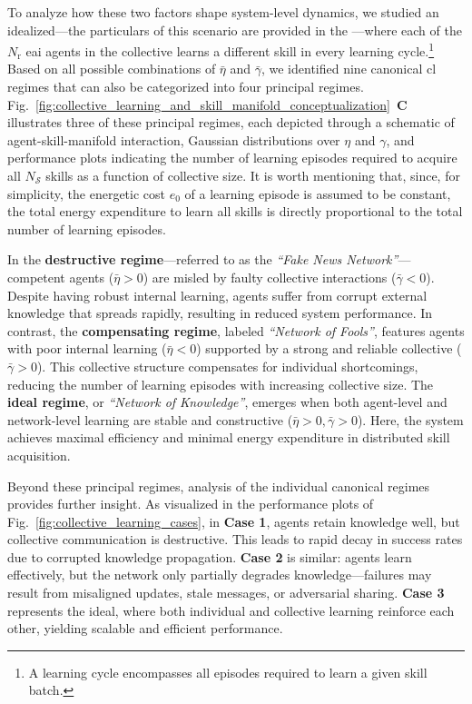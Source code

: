 \documentclass[12pt]{article}
\renewcommand{\emph}[1]{\textit{#1}}
\begin{document}
To analyze how these two factors shape system-level dynamics, we studied an idealized---the particulars of this scenario are provided in the ---where each of the $N_\mathrm{r}$ \ac{eai} agents in the collective learns a different skill in every learning cycle.\footnote{A learning cycle encompasses all episodes required to learn a given skill batch.} Based on all possible combinations of $\bar{\eta}$ and $\bar{\gamma}$, we identified nine canonical \ac{cl} regimes that can also be categorized into four principal regimes. Fig.~\ref{fig:collective_learning_and_skill_manifold_conceptualization}~\textbf{C} illustrates three of these principal regimes, each depicted through a schematic of agent-skill-manifold interaction, Gaussian distributions over $\eta$ and $\gamma$, and performance plots indicating the number of learning episodes required to acquire all $N_\mathcal{S}$ skills as a function of collective size. It is worth mentioning that, since, for simplicity, the energetic cost $ e_0 $ of a learning episode is assumed to be constant, the total energy expenditure to learn all skills is directly proportional to the total number of learning episodes.

In the \textbf{destructive regime}---referred to as the \emph{``Fake News Network''}---competent agents ($\bar{\eta} > 0$) are misled by faulty collective interactions ($\bar{\gamma} < 0$). Despite having robust internal learning, agents suffer from corrupt external knowledge that spreads rapidly, resulting in reduced system performance. In contrast, the \textbf{compensating regime}, labeled \emph{``Network of Fools''}, features agents with poor internal learning ($\bar{\eta} < 0$) supported by a strong and reliable collective ($\bar{\gamma} > 0$). This collective structure compensates for individual shortcomings, reducing the number of learning episodes with increasing collective size. The \textbf{ideal regime}, or \emph{``Network of Knowledge''}, emerges when both agent-level and network-level learning are stable and constructive ($\bar{\eta} > 0, \bar{\gamma} > 0$). Here, the system achieves maximal efficiency and minimal energy expenditure in distributed skill acquisition.

Beyond these principal regimes, analysis of the individual canonical regimes provides further insight. As visualized in the performance plots of Fig.~\ref{fig:collective_learning_cases}, in \textbf{Case 1}, agents retain knowledge well, but collective communication is destructive. This leads to rapid decay in success rates due to corrupted knowledge propagation. \textbf{Case 2} is similar: agents learn effectively, but the network only partially degrades knowledge—failures may result from misaligned updates, stale messages, or adversarial sharing. \textbf{Case 3} represents the ideal, where both individual and collective learning reinforce each other, yielding scalable and efficient performance. 
\end{document}
